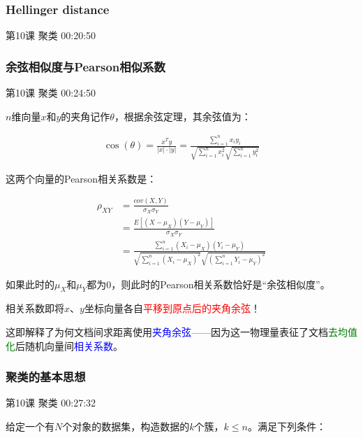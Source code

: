 \documentclass[UTF8]{ctexbook}
\begin{document}
\subsubsection{Hellinger distance}

第10课 聚类 00:20:50

\subsubsection{余弦相似度与Pearson相似系数}

第10课 聚类 00:24:50

$n$维向量$x$和$y$的夹角记作$\theta$，根据余弦定理，其余弦值为：

\begin{equation}
\begin{aligned}
\cos (\theta) = \frac{x^{T}y}{|x| \cdot |y|}=\frac{\sum_{i=1}^{n}x_{i}y_{i}}{\sqrt{\sum_{i=1}^{n}x^{2}_{i}}\sqrt{\sum_{i=1}^{n}y^{2}_{i}}}
\end{aligned}
\end{equation}

这两个向量的Pearson相关系数是：

\begin{equation}
\begin{aligned}
\rho_{XY} &= \frac{cov(X,Y)}{\sigma_{X} \sigma_{Y}} \\
&= \frac{E[(X-\mu_{X})(Y-\mu_{Y})]}{\sigma_{X} \sigma_{Y}}\\
&= \frac{\sum_{i=1}^{n}(X_{i}-\mu_{X})(Y_{i}-\mu_{Y})}{\sqrt{\sum_{i=1}^{n}(X_{i}-\mu_{X})^{2}}\sqrt{(\sum_{i=1}^{n}Y_{i}-\mu_{Y})^{2}}}
\end{aligned}
\end{equation}

如果此时的$\mu_{X}$和$\mu_{Y}$都为0，则此时的Pearson相关系数恰好是“余弦相似度”。

相关系数即将$x$、$y$坐标向量各自\textcolor{red}{平移到原点后的夹角余弦}！

这即解释了为何文档间求距离使用\textcolor{blue}{夹角余弦}——因为这一物理量表征了文档\textcolor{green}{去均值化}后随机向量间\textcolor{blue}{相关系数}。

\subsubsection{聚类的基本思想}

第10课 聚类 00:27:32

给定一个有$N$个对象的数据集，构造数据的$k$个簇，$k \leq n$。满足下列条件：
\end{document}
